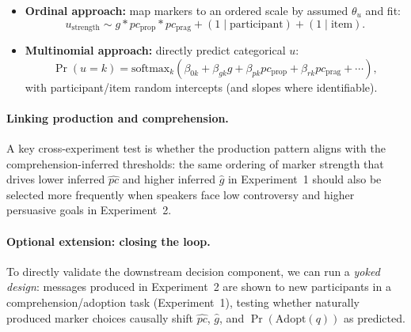\documentclass[12pt]{article}
\begin{document}
\begin{itemize}
\item \textbf{Ordinal approach:} map markers to an ordered scale by assumed $\theta_u$ and fit:
\[
u_{\text{strength}} \sim g * pc_{\text{prop}} * pc_{\text{prag}} + (1\mid \text{participant}) + (1\mid \text{item}).
\]
\item \textbf{Multinomial approach:} directly predict categorical $u$:
\[
\Pr(u=k) = \text{softmax}_k(\beta_{0k} + \beta_{gk} g + \beta_{pk} pc_{\text{prop}} + \beta_{rk} pc_{\text{prag}} + \cdots),
\]
with participant/item random intercepts (and slopes where identifiable).
\end{itemize}

\paragraph{Linking production and comprehension.}
A key cross-experiment test is whether the production pattern aligns with the comprehension-inferred thresholds:
the same ordering of marker strength that drives lower inferred $\widehat{pc}$ and higher inferred $\widehat{g}$ in Experiment~1
should also be selected more frequently when speakers face low controversy and higher persuasive goals in Experiment~2.

\paragraph{Optional extension: closing the loop.}
To directly validate the downstream decision component, we can run a \emph{yoked design}:
messages produced in Experiment~2 are shown to new participants in a comprehension/adoption task (Experiment~1),
testing whether naturally produced marker choices causally shift $\widehat{pc}$, $\widehat{g}$, and $\Pr(\mathrm{Adopt}(q))$ as predicted.

\printbibliography
\end{document}
